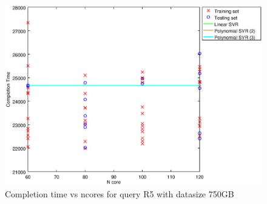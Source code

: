 
\begin {figure}[hbtp]
\centering
\includegraphics[width=\textwidth]{output/R5_750_ONLY_1_LINEAR_NCORE/plot_R5_750_bestmodels.eps}
\caption{Completion time vs ncores for query R5 with datasize 750GB}
\label{fig:only_1_linear_R5_750}
\end {figure}
